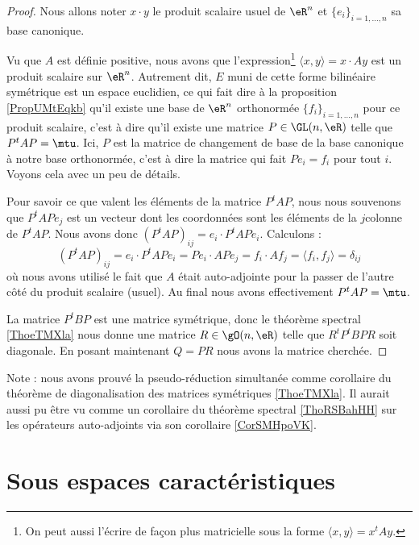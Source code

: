 \begin{proof}
    Nous allons noter \( x\cdot y\) le produit scalaire usuel de \( \eR^n\) et \( \{ e_i \}_{i=1,\ldots, n}\) sa base canonique.

    Vu que \( A\) est définie positive, nous avons que l'expression\footnote{On peut aussi l'écrire de façon plus matricielle sous la forme \( \langle x, y\rangle =x^tAy\).} \( \langle x, y\rangle =x\cdot Ay\) est un produit scalaire sur \( \eR^n\). Autrement dit, \( E\) muni de cette forme bilinéaire symétrique est un espace euclidien, ce qui fait dire à la proposition \ref{PropUMtEqkb} qu'il existe une base de \( \eR^n\) orthonormée \( \{ f_i \}_{i=1,\ldots, n}\) pour ce produit scalaire, c'est à dire qu'il existe une matrice \( P\in \GL(n,\eR)\) telle que \( P^tAP=\mtu\). Ici, \( P\) est la matrice de changement de base de la base canonique à notre base orthonormée, c'est à dire la matrice qui fait \( Pe_i=f_i\) pour tout \( i\). Voyons cela avec un peu de détails.

    Pour savoir ce que valent les éléments de la matrice \( P^tAP\), nous nous souvenons que \( P^tAPe_j\) est un vecteur dont les coordonnées sont les éléments de la \( j\)\ieme colonne de \( P^tAP\). Nous avons donc \( (P^tAP)_{ij}=e_i\cdot P^tAPe_i\). Calculons :
    \begin{equation}
            (P^tAP)_{ij}=e_i\cdot P^tAPe_i
            =Pe_i\cdot APe_j
        =f_i\cdot Af_j
        =\langle f_i, f_j\rangle 
        =\delta_{ij}
    \end{equation}
    où nous avons utilisé le fait que \( A\) était auto-adjointe pour la passer de l'autre côté du produit scalaire (usuel). Au final nous avons effectivement \( P^tAP=\mtu\).

    La matrice \( P^tBP\) est une matrice symétrique, donc le théorème spectral \ref{ThoeTMXla} nous donne une matrice \( R\in \gO(n,\eR)\) telle que \( R^tP^tBPR\) soit diagonale. En posant maintenant \( Q=PR\) nous avons la matrice cherchée.
\end{proof}
Note : nous avons prouvé la pseudo-réduction simultanée comme corollaire du théorème de diagonalisation des matrices symétriques \ref{ThoeTMXla}. Il aurait aussi pu être vu comme un corollaire du théorème spectral \ref{ThoRSBahHH} sur les opérateurs auto-adjoints via son corollaire \ref{CorSMHpoVK}.


\section{Sous espaces caractéristiques}

